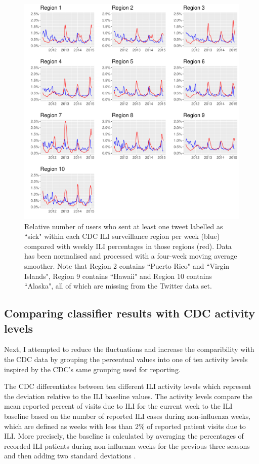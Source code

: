 \documentclass[11pt, a4paper,twoside]{report}\usepackage[]{graphicx}\usepackage[]{color}
\begin{document}
\begin{figure}[htbp!]
\centering
\includegraphics[width=1\linewidth]{33_cdc_twitter_comp_regs_ma4_user.pdf}
\caption{Relative number of users who sent at least one tweet labelled as ``sick" within each CDC ILI surveillance region per week (blue) compared with weekly ILI percentages in those regions (red). Data has been normalised and processed with a four-week moving average smoother. Note that Region 2 contains ``Puerto Rico" and ``Virgin Islands", Region 9 contains ``Hawaii" and Region 10 contains ``Alaska", all of which are missing from the Twitter data set.}
\label{fig:cdc_tw_comp_regs_ma4_user}
\end{figure}

\subsection{Comparing classifier results with CDC activity levels}
\label{sec:comp_cdc_ac}
Next, I attempted to reduce the fluctuations and increase the comparibility with the CDC data by grouping the percentual values into one of ten activity levels inspired by the CDC's same grouping used for reporting.

The CDC differentiates between ten different ILI activity levels which represent the deviation relative to the ILI baseline values. The activity levels compare the mean reported percent of visits due to ILI for the current week to the ILI baseline based on the number of reported ILI cases during non-influenza weeks, which are defined as weeks with less than 2\% of reported patient visits due to ILI. More precisely, the baseline is calculated by averaging the percentages of recorded ILI patients during non-influenza weeks for the previous three seasons and then adding two standard deviations \citep{cdc_surveillance_2016}.
\end{document}
